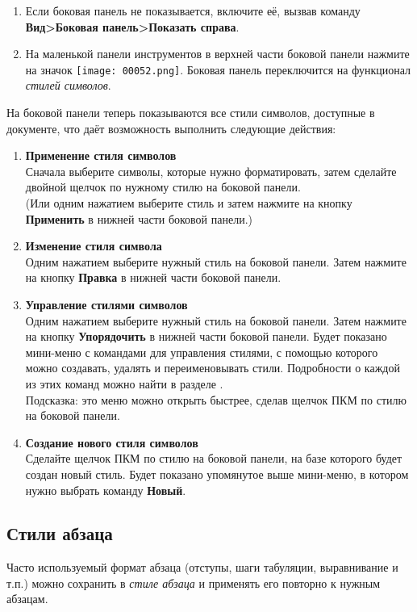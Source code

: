 ﻿\documentclass[a4paper,10pt]{article}
\begin{document}
\begin{enumerate}
 \item Если боковая панель не показывается, включите её, вызвав команду \textbf{Вид>Боковая панель>Показать справа}.
 \item На маленькой панели инструментов в верхней части боковой панели нажмите на значок \texttt{[image: 00052.png]}. Боковая панель переключится на функционал \textit{стилей символов}. 
\end{enumerate}

На боковой панели теперь показываются все стили символов, доступные в документе, что даёт возможность выполнить следующие действия:

\begin{enumerate}
 \item \textbf{Применение стиля символов}\\
 Сначала выберите символы, которые нужно форматировать, затем сделайте двойной щелчок по нужному стилю на боковой панели.\\
 (Или одним нажатием выберите стиль и затем нажмите на кнопку \textbf{Применить} в нижней части боковой панели.)
 \item \textbf{Изменение стиля символа}\\
 Одним нажатием выберите нужный стиль на боковой панели. Затем нажмите на кнопку \textbf{Правка} в нижней части боковой панели.
 \item \textbf{Управление стилями символов}\\
 Одним нажатием выберите нужный стиль на боковой панели. Затем нажмите на кнопку \textbf{Упорядочить} в нижней части боковой панели.
 Будет показано мини-меню с командами для управления стилями, с помощью которого можно создавать, удалять и переименовывать стили. Подробности о каждой из этих команд можно найти в разделе .\\
 Подсказка: это меню можно открыть быстрее, сделав щелчок ПКМ по стилю на боковой панели.
 \item \textbf{Создание нового стиля символов}\\
 Сделайте щелчок ПКМ по стилю на боковой панели, на базе которого будет создан новый стиль. Будет показано упомянутое выше мини-меню, в котором нужно выбрать команду \textbf{Новый}.
\end{enumerate}

\subsection{Стили абзаца} \label{sec:стилиабзаца}
Часто используемый формат абзаца (отступы, шаги табуляции, выравнивание и т.п.) можно сохранить в \textit{стиле абзаца} и применять его повторно к нужным абзацам.
\end{document}
